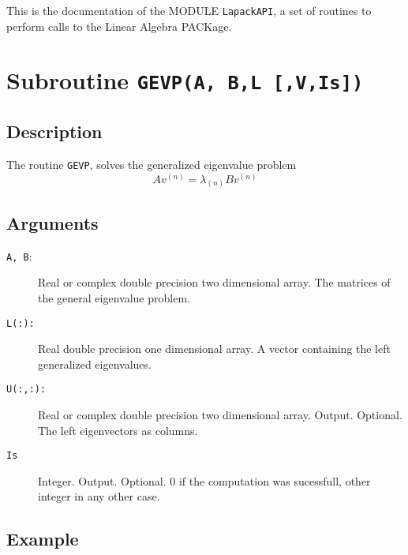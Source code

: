 
This is the documentation of the MODULE \texttt{LapackAPI}, a set
of routines to perform calls to the Linear Algebra PACKage. 



\section{Subroutine \texttt{GEVP(A, B,L [,V,Is])}}

\subsection{Description}

The routine \texttt{GEVP}, solves the generalized eigenvalue problem 
\begin{displaymath}
  Av^{(n)} = \lambda_{(n)}B v^{(n)}
\end{displaymath}

\subsection{Arguments}

\begin{description}
\item[\texttt{A, B}:]  Real or complex double precision two
  dimensional array. The matrices of the general eigenvalue problem.

\item[\texttt{L(:): }] Real double precision one dimensional array. A
  vector containing the left generalized eigenvalues.

\item[\texttt{U(:,:):}] Real or complex double precision two dimensional
  array. Output. Optional. The left eigenvectors as columns.

\item[\texttt{Is}] Integer. Output. Optional. 0 if the computation was
  sucessfull, other integer in any other case. 
\end{description}

\subsection{Example}

